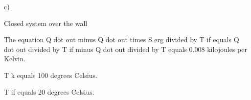c)

Closed system over the wall

The equation Q dot out minus Q dot out times S erg divided by T if equals Q dot out divided by T if minus Q dot out divided by T equals 0.008 kilojoules per Kelvin.

T k equals 100 degrees Celsius.

T if equals 20 degrees Celsius.